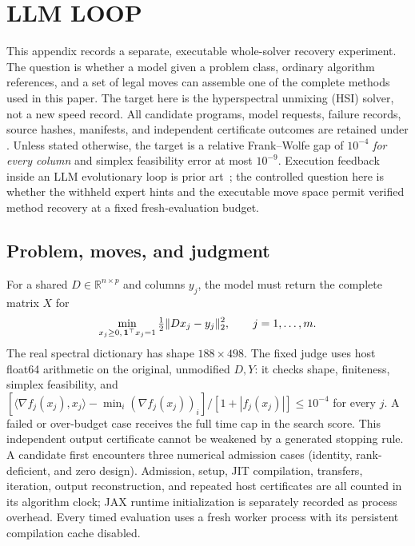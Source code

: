 \section{LLM LOOP}
\label{app:llm-loop}

This appendix records a separate, executable whole-solver recovery experiment.
The question is whether a model given a problem class, ordinary algorithm
references, and a set of legal moves can assemble one of the complete methods
used in this paper. The target here is the hyperspectral unmixing (HSI) solver,
not a new speed record. All candidate programs, model requests, failure records,
source hashes, manifests, and independent certificate outcomes are retained
under . Unless stated otherwise,
the target is a relative Frank--Wolfe gap of $10^{-4}$ \emph{for every column}
and simplex feasibility error at most $10^{-9}$.
Execution feedback inside an LLM evolutionary loop is prior
art~\citep{ye2024reevo}; the controlled question here is whether the withheld
expert hints and the executable move space permit verified method recovery at
a fixed fresh-evaluation budget.

\subsection{Problem, moves, and judgment}
For a shared $D\in\mathbb R^{n\times p}$ and columns $y_j$, the model must
return the complete matrix $X$ for
\begin{equation}
  \min_{x_j\geq0,\,{\bf1}^\top x_j=1}
       \tfrac12\lVert D x_j-y_j\rVert_2^2,\qquad j=1,\ldots,m.
\end{equation}
The real spectral dictionary has shape $188\times498$. The fixed judge uses
host float64 arithmetic on the original, unmodified $D,Y$: it checks shape,
finiteness, simplex feasibility, and
$[\langle\nabla f_j(x_j),x_j\rangle-\min_i(\nabla f_j(x_j))_i]/
 [1+|f_j(x_j)|]\leq10^{-4}$ for every $j$.
A failed or over-budget case receives the full time cap in the search score.
This independent output certificate cannot be weakened by a generated stopping
rule. A candidate first encounters three numerical admission cases (identity,
rank-deficient, and zero design). Admission, setup, JIT compilation, transfers,
iteration, output reconstruction, and repeated host certificates are all counted
in its algorithm clock; JAX runtime initialization is separately recorded as
process overhead. Every timed evaluation uses a fresh worker process with its
persistent compilation cache disabled.

